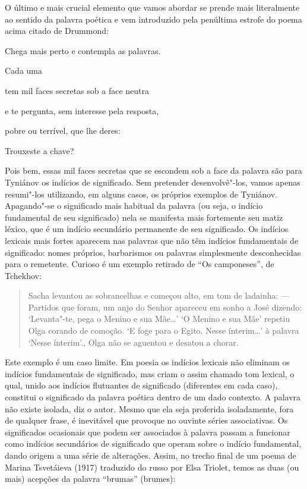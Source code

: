 O último e mais crucial elemento que vamos abordar se prende mais
literalmente ao sentido da palavra poética e vem introduzido pela
penúltima estrofe do poema acima citado de Drummond:

Chega mais perto e contempla as palavras.

Cada uma

tem mil faces secretas sob a face neutra

e te pergunta, sem interesse pela resposta,

pobre ou terrível, que lhe deres:

Trouxeste a chave?

Pois bem, essas mil faces secretas que se escondem sob a face da
palavra são para Tyniánov os indícios de significado. Sem pretender
desenvolvê"-los, vamos apenas resumi"-los utilizando, em alguns casos, os
próprios exemplos de Tyniánov. Apagando"-se o significado mais habitual
da palavra (ou seja, o indício fundamental de seu significado) nela se
manifesta mais fortemente seu matiz léxico, que é um indício secundário
permanente de seu significado. Os indícios lexicais mais fortes aparecem
nas palavras que não têm indícios fundamentais de significado: nomes
próprios, barbarismos ou palavras simplesmente desconhecidas para o
remetente. Curioso é um exemplo retirado de ``Os camponeses'', de
Tchekhov:

\begin{quote}
Sacha levantou as sobrancelhas e começou alto, em tom de ladainha: ---
Partidos que foram, um anjo do Senhor apareceu em sonho a José dizendo:
`Levanta"-te, pega o Menino e sua Mãe\ldots{}' `O Menino e sua Mãe' repetiu
Olga corando de comoção. `E foge para o Egito. Nesse ínterim\ldots{}' à
palavra `Nesse ínterim'., Olga não se aguentou e desatou a chorar.
\end{quote}

Este exemplo é um caso limite. Em poesia os indícios lexicais não
eliminam os indícios fundamentais de significado, mas criam o assim
chamado tom lexical, o qual, unido aos indícios flutuantes de
significado (diferentes em cada caso), constitui o significado da
palavra poética dentro de um dado contexto. A palavra não existe
isolada, diz o autor. Mesmo que ela seja proferida isoladamente, fora de
qualquer frase, é inevitável que provoque no ouvinte séries
associativas. Os significados ocasionais que podem ser associados à
palavra passam a funcionar como indícios secundários de significado que
operam sobre o indício fundamental, dando origem a uma série de
alterações. Assim, no trecho final de um poema de Marina Tsvetáieva
(1917) traduzido do russo por Elsa Triolet, temos as duas (ou mais) acepções da
palavra ``brumas'' (brumes):

